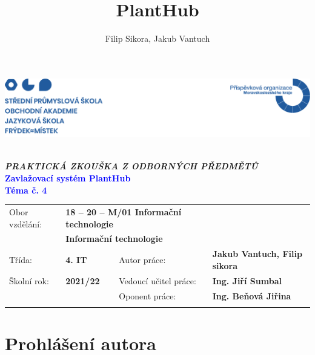 \documentclass[czech,12pt,a4paper]{article}
\title{PlantHub}
\author{Filip Sikora, Jakub Vantuch}
\date{}
\newcommand\blankpage{%
    \null
    \thispagestyle{empty}%
    \addtocounter{page}{-1}%
    \newpage}
\begin{document}
\renewcommand*\listfigurename{}
\renewcommand{\figurename}{Obr.}
\renewcommand\refname{}

\afterpage{\blankpage}
\begin{titlepage}
	\vspace*{-1.7cm}
	\noindent\includegraphics[width=\linewidth]{header.png}
	\begin{center}
		\vspace*{4.4cm}
		{\fontsize{19}{20}\selectfont\lsstyle{\textcolor{blue}{MATURITNÍ ZKOUŠKA}}}
		\vspace*{7mm} \\
		\small\textbf{\emph{PRAKTICKÁ ZKOUŠKA Z ODBORNÝCH PŘEDMĚTŮ}}
		\vspace*{5.7cm} \\
		\large\textbf{\textcolor{blue}{Zavlažovací systém PlantHub}} \\
		\vspace*{5mm}
		\large\textbf{\textcolor{blue}{Téma č. 4}} \\
		\vfill
		\normalsize
	\end{center}
	\begin{tabularx}{\textwidth}{l@{\hskip 0.5cm}XXl}
		Obor vzdělání: & \multicolumn{2}{l}{\textbf{18 – 20 – M/01 Informační technologie}} \\[10pt]
		& \multicolumn{2}{l}{\textbf{Informační technologie}} \\[10pt]
		Třída: & \textbf{4. IT} & Autor práce: & \textbf{Jakub Vantuch, Filip sikora} \\[10pt]
		Školní rok: & \textbf{2021/22} & Vedoucí učitel práce: & \textbf{Ing. Jiří Sumbal} \\[10pt]
		& & Oponent práce: & \textbf{Ing. Beňová Jiřina} \\[10pt]
		\vspace*{1cm}
	\end{tabularx}
\end{titlepage}

\clearpage

\section*{Prohlášení autora}
\end{document}

